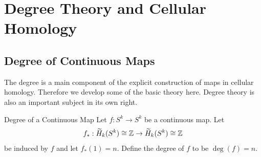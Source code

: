 \documentclass[a4paper]{article}
\begin{document}
\pagebreak
\section{Degree Theory and Cellular Homology}
\subsection{Degree of Continuous Maps}
The degree is a main component of the explicit construction of maps in cellular homology. Therefore we develop some of the basic theory here. Degree theory is also an important subject in its own right. 

\begin{defn}{Degree of a Continuous Map}{} Let $f:S^k\to S^k$ be a continuous map. Let $$f_\ast:\widetilde{H}_k(S^k)\cong\mathbb{Z}\to\widetilde{H}_k(S^k)\cong\mathbb{Z}$$ be induced by $f$ and let $f_\ast(1)=n$. Define the degree of $f$ to be $\deg(f)=n$. 
\end{defn}
\end{document}
